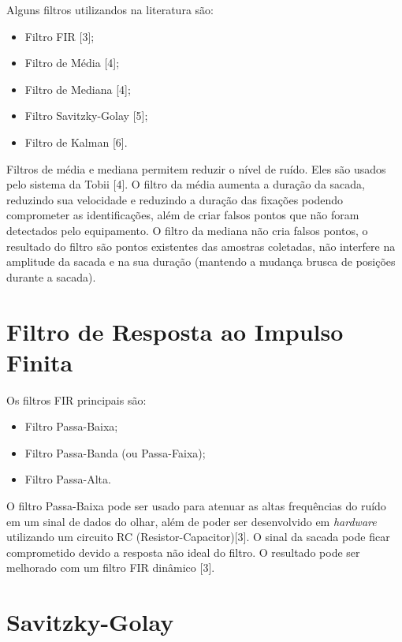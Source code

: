 \documentclass[brazil,]{report}
\newcommand{\sectionbreak}{\clearpage}
\begin{document}
Alguns filtros utilizandos na literatura são:

\begin{itemize}
\itemsep1pt\parskip0pt
\item
  Filtro \gls{FIR} {[}3{]};
\item
  Filtro de Média {[}4{]};
\item
  Filtro de Mediana {[}4{]};
\item
  Filtro Savitzky-Golay {[}5{]};
\item
  Filtro de Kalman {[}6{]}.
\end{itemize}

Filtros de média e mediana permitem reduzir o nível de ruído. Eles são
usados pelo sistema da Tobii {[}4{]}. O filtro da média aumenta a
duração da sacada, reduzindo sua velocidade e reduzindo a duração das
fixações podendo comprometer as identificações, além de criar falsos
pontos que não foram detectados pelo equipamento. O filtro da mediana
não cria falsos pontos, o resultado do filtro são pontos existentes das
amostras coletadas, não interfere na amplitude da sacada e na sua
duração (mantendo a mudança brusca de posições durante a sacada).

\renewcommand{\sectionbreak}{}

\section{Filtro de Resposta ao Impulso
Finita}\label{filtro-de-resposta-ao-impulso-finita}

Os filtros \gls{FIR} principais são:

\begin{itemize}
\itemsep1pt\parskip0pt
\item
  Filtro Passa-Baixa;
\item
  Filtro Passa-Banda (ou Passa-Faixa);
\item
  Filtro Passa-Alta.
\end{itemize}

O filtro Passa-Baixa pode ser usado para atenuar as altas frequências do
ruído em um sinal de dados do olhar, além de poder ser desenvolvido em
\emph{hardware} utilizando um circuito RC (Resistor-Capacitor){[}3{]}. O
sinal da sacada pode ficar comprometido devido a resposta não ideal do
filtro. O resultado pode ser melhorado com um filtro FIR dinâmico
{[}3{]}.

\section{Savitzky-Golay}\label{savitzky-golay}
\end{document}
